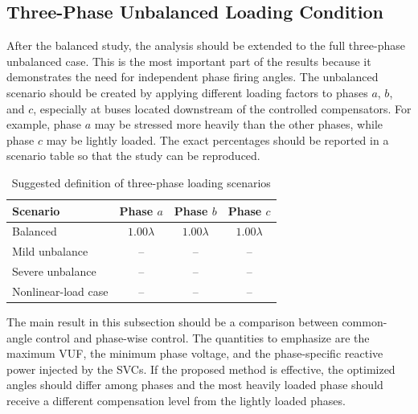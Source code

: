 
\subsection{Three-Phase Unbalanced Loading Condition}
\label{subsec:unbalanced_results}

After the balanced study, the analysis should be extended to the full
three-phase unbalanced case. This is the most important part of the results
because it demonstrates the need for independent phase firing angles. The
unbalanced scenario should be created by applying different loading factors
to phases $a$, $b$, and $c$, especially at buses located downstream of the
controlled compensators. For example, phase $a$ may be stressed more heavily
than the other phases, while phase $c$ may be lightly loaded. The exact
percentages should be reported in a scenario table so that the study can be
reproduced.

\begin{table}[!t]
\centering
\caption{Suggested definition of three-phase loading scenarios}
\label{tab:unbalanced_scenarios_suggested}
\footnotesize
\renewcommand{\arraystretch}{1.2}
\begin{tabular}{@{}lccc@{}}
\toprule
\textbf{Scenario} & Phase $a$ & Phase $b$ & Phase $c$ \\
\midrule
Balanced & $1.00\lambda$ & $1.00\lambda$ & $1.00\lambda$ \\
Mild unbalance & -- & -- & -- \\
Severe unbalance & -- & -- & -- \\
Nonlinear-load case & -- & -- & -- \\
\bottomrule
\end{tabular}
\end{table}

\noindent The main result in this subsection should be a comparison between
common-angle control and phase-wise control. The quantities to emphasize are
the maximum VUF, the minimum phase voltage, and the phase-specific reactive
power injected by the SVCs. If the proposed method is effective, the
optimized angles should differ among phases and the most heavily loaded
phase should receive a different compensation level from the lightly loaded
phases.

